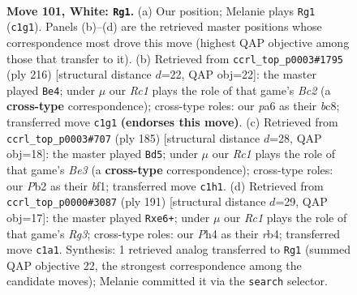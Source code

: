 \documentclass[11pt]{article}
\begin{document}
\begin{figure}[p]\centering
\begin{subfigure}{0.46\textwidth}\centering
\resizebox{\linewidth}{!}{%
\newchessgame
\chessboard[
  setfen={3r4/8/p2k4/P1p2p1p/1p3P1P/4P1P1/1P4K1/2R5 w - - 13 101},
  showmover=false,
  pgfstyle=straightmove, color=movearrow, markmove={c1-g1}
]}
\caption{}
\end{subfigure}\hfill
\begin{subfigure}{0.46\textwidth}\centering
\resizebox{\linewidth}{!}{%
\newchessgame
\chessboard[
  setfen={2b5/p4p2/1p1k2p1/7p/1P3P1P/P3K1P1/2B5/8 w - - 45 109},
  showmover=false,
  pgfstyle=straightmove, color=movearrow, markmove={c2-e4}
]}
\caption{}
\end{subfigure}
\\[4pt]
\begin{subfigure}{0.46\textwidth}\centering
\resizebox{\linewidth}{!}{%
\newchessgame
\chessboard[
  setfen={8/8/2k1b1p1/2p2pPp/1p3P1P/1P6/P2K4/5B2 b - - 3 93},
  showmover=false,
  pgfstyle=straightmove, color=movearrow, markmove={e6-d5}
]}
\caption{}
\end{subfigure}\hfill
\begin{subfigure}{0.46\textwidth}\centering
\resizebox{\linewidth}{!}{%
\newchessgame
\chessboard[
  setfen={4k3/4p3/p2pP1r1/P4p1p/1RP4P/4KPP1/8/8 b - - 0 96},
  showmover=false,
  pgfstyle=straightmove, color=movearrow, markmove={g6-e6}
]}
\caption{}
\end{subfigure}
\caption{\textbf{Move 101, White: \texttt{Rg1}.} (a) Our position; Melanie plays \texttt{Rg1} (\texttt{c1g1}). Panels (b)--(d) are the retrieved master positions whose correspondence most drove this move (highest QAP objective among those that transfer to it). (b) Retrieved from \texttt{ccrl\_top\_p0003\#1795} (ply 216) [structural distance $d$=22, QAP obj=22]: the master played \texttt{Be4}; under $\mu$ our \emph{Rc1} plays the role of that game's \emph{Bc2} (a \textbf{cross-type} correspondence); cross-type roles: our \emph{p}a6 as their \emph{b}c8; transferred move \texttt{c1g1} \textbf{(endorses this move)}. (c) Retrieved from \texttt{ccrl\_top\_p0003\#707} (ply 185) [structural distance $d$=28, QAP obj=18]: the master played \texttt{Bd5}; under $\mu$ our \emph{Rc1} plays the role of that game's \emph{Be3} (a \textbf{cross-type} correspondence); cross-type roles: our \emph{P}b2 as their \emph{b}f1; transferred move \texttt{c1h1}. (d) Retrieved from \texttt{ccrl\_top\_p0000\#3087} (ply 191) [structural distance $d$=29, QAP obj=17]: the master played \texttt{Rxe6+}; under $\mu$ our \emph{Rc1} plays the role of that game's \emph{Rg3}; cross-type roles: our \emph{P}h4 as their \emph{r}b4; transferred move \texttt{c1a1}. Synthesis: 1 retrieved analog transferred to \texttt{Rg1} (summed QAP objective 22, the strongest correspondence among the candidate moves); Melanie committed it via the \texttt{search} selector.}
\label{fig:thought-m200}
\end{figure}
\end{document}
